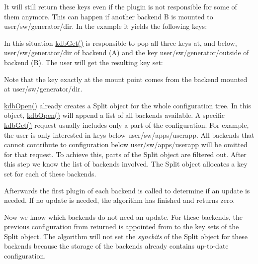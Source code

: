 It will still return these keys even if the plugin is not responsible for some of them anymore. This can happen if another backend B is mounted to {\ttfamily user/sw/generator/dir}. In the example it yields the following keys\+:


\begin{DoxyCode}{0}
\end{DoxyCode}


In this situation {\ttfamily \mbox{\hyperlink{group__kdb_ga28e385fd9cb7ccfe0b2f1ed2f62453a1}{kdb\+Get()}}} is responsible to pop all three keys at, and below, {\ttfamily user/sw/generator/dir} of backend (A) and the key {\ttfamily user/sw/generator/outside} of backend (B). The user will get the resulting key set\+:


\begin{DoxyCode}{0}
\end{DoxyCode}


Note that the key exactly at the mount point comes from the backend mounted at {\ttfamily user/sw/generator/dir}.

{\ttfamily \mbox{\hyperlink{group__kdb_ga6808defe5870f328dd17910aacbdc6ca}{kdb\+Open()}}} already creates a {\ttfamily Split} object for the whole configuration tree. In this object, {\ttfamily \mbox{\hyperlink{group__kdb_ga6808defe5870f328dd17910aacbdc6ca}{kdb\+Open()}}} will append a list of all backends available. A specific {\ttfamily \mbox{\hyperlink{group__kdb_ga28e385fd9cb7ccfe0b2f1ed2f62453a1}{kdb\+Get()}}} request usually includes only a part of the configuration. For example, the user is only interested in keys below {\ttfamily user/sw/apps/userapp}. All backends that cannot contribute to configuration below {\ttfamily user/sw/apps/userapp} will be omitted for that request. To achieve this, parts of the {\ttfamily Split} object are filtered out. After this step we know the list of backends involved. The {\ttfamily Split} object allocates a key set for each of these backends.

Afterwards the first plugin of each backend is called to determine if an update is needed. If no update is needed, the algorithm has finished and returns zero.

Now we know which backends do not need an update. For these backends, the previous configuration from {\ttfamily returned} is appointed from to the key sets of the {\ttfamily Split} object. The algorithm will not set the {\itshape syncbits} of the {\ttfamily Split} object for these backends because the storage of the backends already contains up-\/to-\/date configuration.

